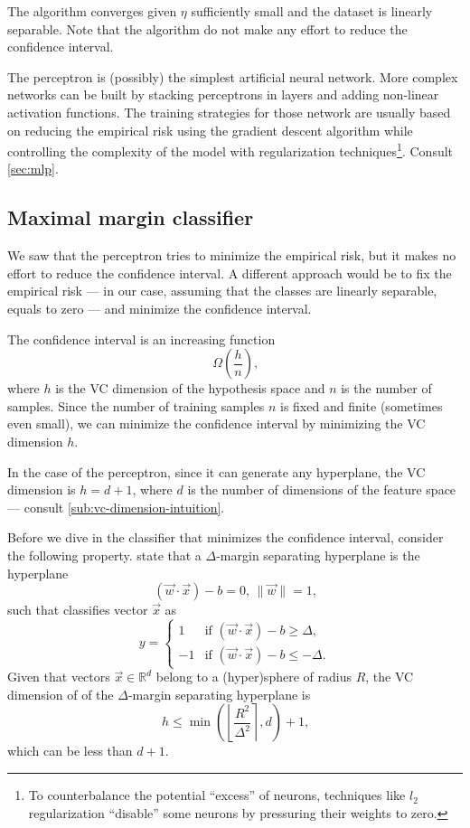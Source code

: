The algorithm converges given $\eta$ sufficiently small and the dataset is linearly
separable.  Note that the algorithm do not make any effort to reduce the confidence
interval.

The perceptron is (possibly) the simplest artificial neural network.  More complex
networks can be built by stacking perceptrons in layers and adding non-linear activation
functions.  The training strategies for those network are usually based on reducing the
empirical risk using the gradient descent algorithm while controlling the complexity of
the model with regularization techniques\footnote{To counterbalance the potential
``excess'' of neurons, techniques like $l_2$ regularization ``disable'' some neurons by
pressuring their weights to zero.}.  Consult \cref{sec:mlp}.


\subsection{Maximal margin classifier}

We saw that the perceptron tries to minimize the empirical risk, but it makes no effort to
reduce the confidence interval.  A different approach would be to fix the empirical risk
--- in our case, assuming that the classes are linearly separable, equals to zero --- and
minimize the confidence interval.

The confidence interval is an increasing function
\[
  \Omega\!\left(\frac{h}{n}\right)\text{,}
\]
where $h$ is the VC dimension of the hypothesis space and $n$ is the number of samples.
Since the number of training samples $n$ is fixed and finite (sometimes even small), we
can minimize the confidence interval by minimizing the VC dimension $h$.

In the case of the perceptron, since it can generate any hyperplane, the VC dimension is
$h = d + 1$, where $d$ is the number of dimensions of the feature space --- consult
\cref{sub:vc-dimension-intuition}.

Before we dive in the classifier that minimizes the confidence interval, consider the
following property.  \citeauthor{Vapnik1999b} state that a
$\Delta$-margin separating hyperplane is the hyperplane
\[
  (\vec{w} \cdot \vec{x}) - b = 0\text{, } \|\vec{w}\| = 1\text{,}
\]
such that classifies vector $\vec{x}$ as
\[
  y = \begin{cases}
    1 & \text{if } (\vec{w} \cdot \vec{x}) - b \geq \Delta\text{,} \\
    -1 & \text{if } (\vec{w} \cdot \vec{x}) - b \leq -\Delta\text{.}
  \end{cases}
\]
Given that vectors $\vec{x} \in \mathbb{R}^d$ belong to a (hyper)sphere of radius $R$, the
VC dimension of of the $\Delta$-margin separating hyperplane is
\[
  h \leq \min\left(\left\lfloor \frac{R^2}{\Delta^2} \right\rceil, d\right) + 1\text{,}
\]
which can be less than $d + 1$.

